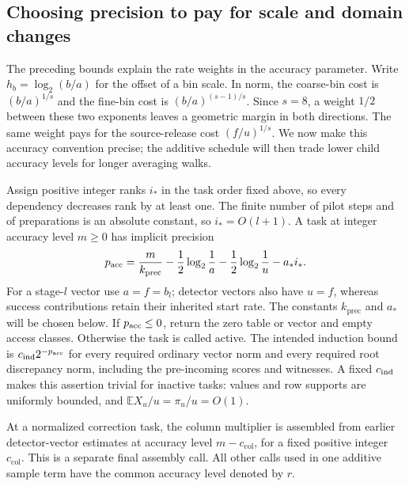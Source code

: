 \documentclass[11pt]{article}
\numberwithin{equation}{section}
\theoremstyle{definition}
\theoremstyle{remark}
\begin{document}
\subsection{Choosing precision to pay for scale and domain changes}

The preceding bounds explain the rate weights in the accuracy parameter.
Write $h_b=\log_2(b/a)$ for the offset of a bin scale.
In norm, the coarse-bin cost is $(b/a)^{1/s}$ and the fine-bin cost is
$(b/a)^{(s-1)/s}$.  Since $s=8$, a weight $1/2$ between these two
exponents leaves a geometric margin in both directions.  The same
weight pays for the source-release cost $(f/u)^{1/s}$.  We now make
this accuracy convention precise; the additive schedule will then
trade lower child accuracy levels for longer averaging walks.

Assign positive integer ranks $i_*$ in the task order fixed above, so every
dependency decreases rank by at least one.  The finite number of pilot steps and of
preparations is an absolute constant, so $i_*=O(l+1)$.  A task at integer
accuracy level ${m}\ge0$ has implicit precision
\begin{equation}
 {p_{\rm acc}}=\frac{{m}}{{k}_{\mathrm{prec}}}-\frac12\log_2\frac1a
        -\frac12\log_2\frac1u-{a}_*i_*.
 \label{eq:est-precision}
\end{equation}
For a stage-$l$ vector use $a=f=b_l$; detector vectors also have $u=f$,
whereas success contributions retain their inherited start rate.  The constants
${k}_{\mathrm{prec}}$ and ${a}_*$ will be chosen below.  If ${p_{\rm acc}}\le0$, return the zero
table or vector and empty access classes.  Otherwise the task is called
active.  The intended induction bound is ${c_{\rm ind}}2^{-{p_{\rm acc}}}$ for every required
ordinary vector norm and every required root discrepancy norm, including
the pre-incoming scores and witnesses.  A fixed ${c_{\rm ind}}$ makes this assertion
trivial for inactive tasks: values and row supports are uniformly bounded,
and $\mathbb E X_u/u=\pi_u/u=O(1)$.

At a normalized correction task, the column multiplier is assembled from
earlier detector-vector estimates at accuracy level ${m}-c_{\mathrm{col}}$, for a fixed
positive integer $c_{\mathrm{col}}$.  This is a separate final assembly call.
All other calls used in one additive sample term have the common
accuracy level denoted by ${r}$.
\end{document}
